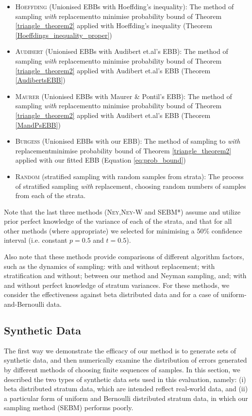 \begin{itemize}
\item \textsc{Hoeffding} (Unionised EBBs with Hoeffding's inequality): The method of sampling \textit{with} replacementto minimise probability bound of Theorem \ref{triangle_theorem2} applied with Hoeffding's inequality (Theorem \ref{Hoeffdings_inequality_proper})
\item \textsc{Audibert} (Unionised EBBs with Audibert et.al's EBB): The method of sampling \textit{with} replacementto minimise probability bound of Theorem \ref{triangle_theorem2} applied with Audibert et.al's EBB (Theorem \ref{AudibertsEBB})
\item \textsc{Maurer} (Unionised EBBs with Maurer \& Pontil's EBB): The method of sampling \textit{with} replacementto minimise probability bound of Theorem \ref{triangle_theorem2} applied with Audibert et.al's EBB (Theorem \ref{MandPsEBB})
\item \textsc{Burgess} (Unionised EBBs with our EBB): The method of sampling to \textit{with} replacementminimise probability bound of Theorem \ref{triangle_theorem2} applied with our fitted EBB (Equation \ref{eq:prob_bound})
\item \textsc{Random} (stratified sampling with random samples from strata): The process of stratified sampling \textit{with} replacement, choosing random numbers of samples from each of the strata.
\end{itemize}
Note that the last three methods (\textsc{Ney},\textsc{Ney-W} and SEBM*) assume and utilize prior perfect knowledge of the variance of each of the strata, and that for all other methods (where appropriate) we selected for minimising a 50\% confidence interval (i.e. constant $p=0.5$ and $t=0.5$).

Also note that these methods provide comparisons of different algorithm factors, such as the dynamics of sampling: with and without replacement; with stratification and without; between our method and Neyman sampling, and; with and without perfect knowledge of stratum variances. 
For these methods, we consider the effectiveness against beta distributed data and for a case of uniform-and-Bernoulli data.

\subsection{Synthetic Data}
\label{ssec:SyntheticDists}
The first way we demonstrate the efficacy of our method is to generate sets of synthetic data, and then numerically examine the distribution of errors generated by different methods of choosing finite sequences of samples.
In this section, we described the two types of synthetic data sets used in this evaluation, namely: 
(i) beta distributed stratum data, which are intended reflect real-world data, and 
(ii) a particular form of uniform and Bernoulli distributed stratum data, in which our sampling method (SEBM) performs poorly.

